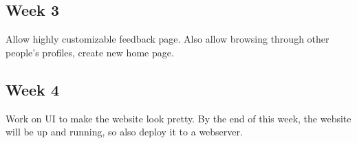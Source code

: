 \documentclass[a4paper]{article}
\begin{document}
\subsection{Week 3} %
\label{sub:Week 3}
Allow highly customizable feedback page. Also allow browsing through other people's profiles, create new home page.
\subsection{Week 4} %
\label{sub:Week 4}
Work on UI to make the website look pretty. By the end of this week, the website will be up and running, so also deploy it to a webserver.
\end{document}
